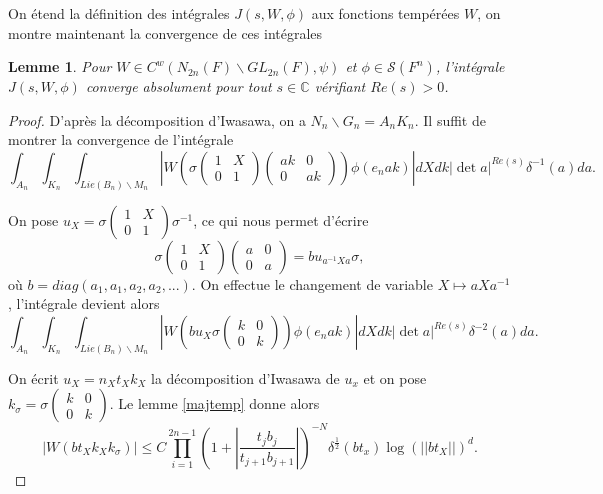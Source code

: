 \documentclass{amsart}
\newtheorem{lemme}{Lemme}[section]
\begin{document}
On étend la définition des intégrales $J(s, W, \phi)$ aux fonctions tempérées $W$, on montre maintenant la convergence de ces intégrales
\begin{lemme}
\label{convtemp}
Pour $W \in C^w(N_{2n}(F)\backslash{GL_{2n}(F)}, \psi)$ et $\phi \in \mathcal{S}(F^n)$, l'intégrale $J(s, W, \phi)$ converge absolument pour tout $s \in \mathbb{C}$ vérifiant $Re(s) > 0$.
\end{lemme}
 
 \begin{proof}
 D'après la décomposition d'Iwasawa, on a $N_n\backslash{G_n} = A_nK_n$. Il suffit de montrer la convergence de l'intégrale
 \begin{equation}
 \int_{A_n} \int_{K_n} \int_{Lie(B_n)\backslash{M_n}} \left|W\left(\sigma \begin{pmatrix}
1 & X \\
0 & 1
\end{pmatrix}\begin{pmatrix}
ak & 0 \\
0 & ak
\end{pmatrix}\right) \phi(e_nak)\right| dX dk \left|\det a\right|^{Re(s)} \delta^{-1}(a) da.
 \end{equation}
 
 On pose $u_X = \sigma \begin{pmatrix}
1 & X \\
0 & 1
\end{pmatrix} \sigma^{-1}$, ce qui nous permet d'écrire
\begin{equation}
\sigma \begin{pmatrix}
1 & X \\
0 & 1
\end{pmatrix}\begin{pmatrix}
a & 0 \\
0 & a
\end{pmatrix} = b u_{a^{-1}Xa} \sigma,
\end{equation}
 où $b=diag(a_1,a_1,a_2,a_2,...)$. On effectue le changement de variable $X \mapsto aXa^{-1}$, l'intégrale devient alors
 \begin{equation}
\int_{A_n} \int_{K_n} \int_{Lie(B_n)\backslash{M_n}} \left|W\left(b u_X \sigma \begin{pmatrix}
k & 0 \\
0 & k
\end{pmatrix}\right)\phi(e_nak)\right|dX dk |\det a|^{Re(s)} \delta^{-2}(a) da.
 \end{equation}
 
 On écrit $u_X = n_Xt_Xk_X$ la décomposition d'Iwasawa de $u_x$ et on pose $k_\sigma = \sigma \begin{pmatrix}
k & 0 \\
0 & k
\end{pmatrix}$. Le lemme \ref{majtemp} donne alors
 \begin{equation}
 |W(bt_Xk_Xk_\sigma)| \leq C \prod_{i=1}^{2n-1} (1+  |\frac{t_jb_j}{t_{j+1}b_{j+1}}|)^{-N} \delta^{\frac{1}{2}}(bt_x)\log(||bt_X||)^d.
 \end{equation}
 

\end{proof}
\end{document}
